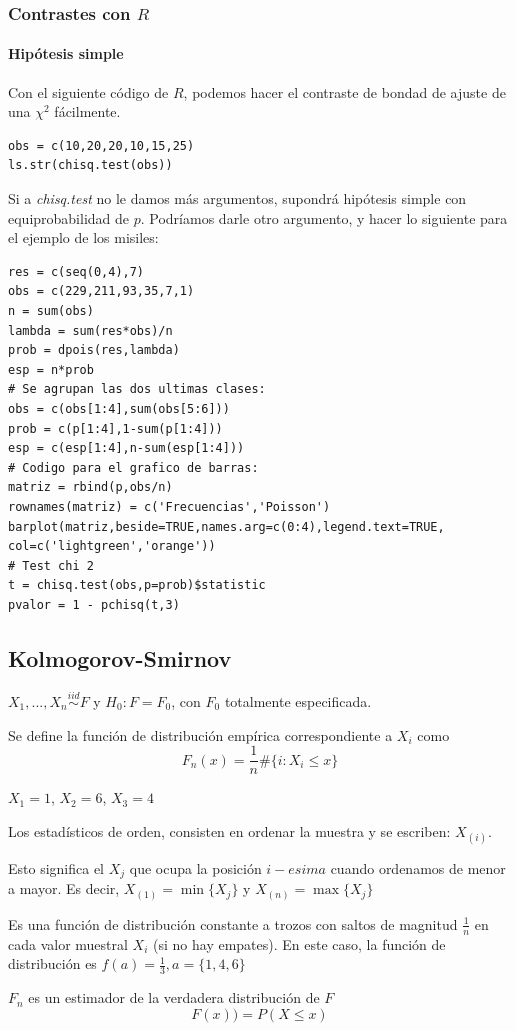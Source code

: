 \subsubsection{Contrastes con $R$}
\paragraph{Hipótesis simple}
Con el siguiente código de $R$, podemos hacer el contraste de bondad de ajuste de una $\chi^2$ fácilmente.

\begin{lstlisting}[style=mystyle]
obs = c(10,20,20,10,15,25)
ls.str(chisq.test(obs))
\end{lstlisting}

Si a \textit{chisq.test} no le damos más argumentos, supondrá hipótesis simple con equiprobabilidad de $p$. Podríamos darle otro argumento, y hacer lo siguiente para el ejemplo de los misiles:

\begin{lstlisting}[style=mystyle]
res = c(seq(0,4),7)
obs = c(229,211,93,35,7,1)
n = sum(obs)
lambda = sum(res*obs)/n
prob = dpois(res,lambda)
esp = n*prob
# Se agrupan las dos ultimas clases:
obs = c(obs[1:4],sum(obs[5:6]))
prob = c(p[1:4],1-sum(p[1:4]))
esp = c(esp[1:4],n-sum(esp[1:4]))
# Codigo para el grafico de barras:
matriz = rbind(p,obs/n)
rownames(matriz) = c('Frecuencias','Poisson')
barplot(matriz,beside=TRUE,names.arg=c(0:4),legend.text=TRUE,
col=c('lightgreen','orange'))
# Test chi 2
t = chisq.test(obs,p=prob)$statistic
pvalor = 1 - pchisq(t,3)
\end{lstlisting}



\subsection{Kolmogorov-Smirnov}

$X_1,...,X_n \overset{iid}{\sim} F$ y $H_0 : F=F_0$, con $F_0$ totalmente especificada.

Se define la función de distribución empírica correspondiente a $X_i$ como \[F_n(x) = \frac{1}{n}\#\{ i : X_i\leq x\}\]


\begin{example}
$X_1 = 1$, $X_2 = 6$, $X_3 = 4$
\begin{defn}

Los estadísticos de orden, consisten en ordenar la muestra y se escriben: $X_{(i)}$.

Esto significa el $X_j$ que ocupa la posición $i-esima$ cuando ordenamos de menor a mayor. Es decir, $X_{(1)} = \min\{X_j\}$ y $X_{(n)} = \max\{X_j\}$ 
\end{defn}
Es una función de distribución constante a trozos con saltos de magnitud $\frac{1}{n}$ en cada valor muestral $X_i$ (si no hay empates). En este caso, la función de distribución es $f(a) = \frac{1}{3}, a=\{1,4,6\}$

$F_n$ es un estimador de la verdadera distribución de $F$ \[F(x)) = P(X\leq x)\]
\end{example}

